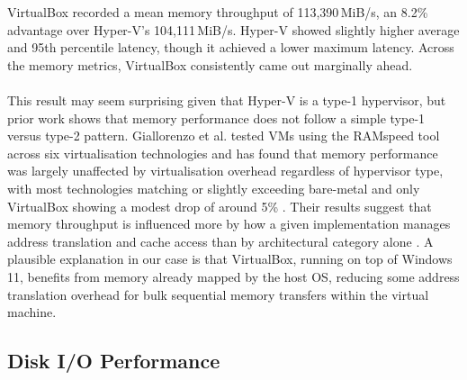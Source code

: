 \documentclass[a4paper, 12pt]{article}
\theoremstyle{plain}
\theoremstyle{definition}
\theoremstyle{remark}
\begin{document}
    VirtualBox recorded a mean memory throughput of 113{,}390\,MiB/s, 
    an 8.2\% advantage over Hyper-V's 104{,}111\,MiB/s. Hyper-V showed slightly higher average and
    95th percentile latency, though it achieved a lower maximum latency. 
    Across the memory metrics, VirtualBox consistently came out marginally ahead.\\
    \\
    \noindent This result may seem surprising given that Hyper-V is a type-1 hypervisor, but prior
    work shows that memory performance does not follow a simple type-1 versus type-2
    pattern. Giallorenzo et al. tested VMs using the RAMspeed tool across six 
    virtualisation technologies and has found that memory performance
    was largely unaffected by virtualisation overhead regardless of hypervisor type,
    with most technologies matching or slightly exceeding bare-metal and only
    VirtualBox showing a modest drop of around 5\% \parencite{giallorenzoVirtualizationCostsBenchmarking2021}. 
    Their results suggest that memory throughput is influenced more by how a given 
    implementation manages address translation and cache access than by architectural category alone \parencite{giallorenzoVirtualizationCostsBenchmarking2021}. 
    A plausible explanation in our case is that VirtualBox, running on top of Windows 11, 
    benefits from memory already mapped by the host OS, reducing some address translation overhead
    for bulk sequential memory transfers within the virtual machine.

    \subsection{Disk I/O Performance}
\end{document}
